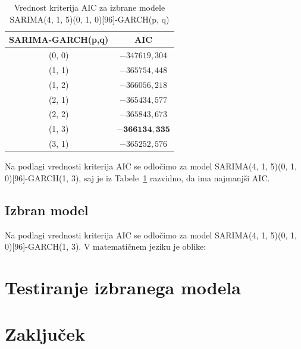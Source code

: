 \documentclass[a4paper, 11pt]{article}
\begin{document}
\begin{table}[!ht]
    \centering
    \caption{Vrednost kriterija AIC za izbrane modele SARIMA(4, 1, 5)(0, 1, 0)[96]-GARCH(p, q)}\par\medskip
    \label{Tab:GARCH_AIC}
    \begin{tabular}{c|c}
        SARIMA-GARCH(p,q) & AIC \\ \hline
        (0, 0) & $-347619{,}304$ \\ 
        (1, 1) & $-365754{,}448$ \\ 
        (1, 2) & $-366056{,}218$ \\ 
        (2, 1) & $-365434{,}577$ \\ 
        (2, 2) & $-365843{,}673$ \\ 
        (1, 3) & $\mathbf{-366134{,}335}$ \\ 
        (3, 1) & $-365252{,}576$ \\ 
    \end{tabular}
\end{table}

\noindent Na podlagi vrednosti kriterija AIC se odločimo za model SARIMA(4, 1, 5)(0, 1, 0)[96]-GARCH(1, 3), saj
je iz Tabele~\ref{Tab:GARCH_AIC} razvidno, da ima najmanjši AIC. 


\subsection{Izbran model}

Na podlagi vrednosti kriterija AIC se odločimo za model SARIMA(4, 1, 5)(0, 1, 0)[96]-GARCH(1, 3). 
V matematičnem jeziku je oblike:




\section{Testiranje izbranega modela}






\section{Zaključek}




\pagebreak



\end{document}
